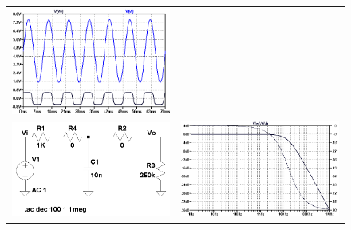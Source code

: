 \begin{figure}[H]
\begin{tabular}{c c}
        \includegraphics[scale=0.5]{../EJ5/Recursos/Simulaciones/medicion_alineal.png} \\
        \includegraphics[scale=0.40]{../EJ5/Recursos/Simulaciones/circuito_filtro.png} &
        \includegraphics[scale=0.43]{../EJ5/Recursos/Simulaciones/medicion_filtro.png} \\
    \end{tabular}
    \label{fig:simulacion_pedal}
\end{figure}

